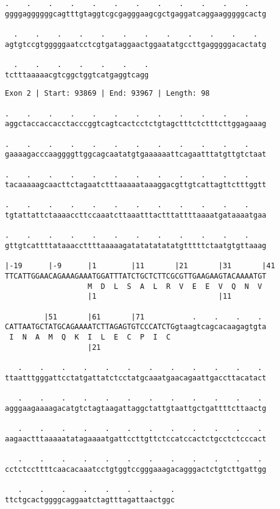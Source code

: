 \documentclass{article}
\begin{document}
\newpage
\begin{Verbatim}[fontfamily=courier]
  .    .    .    .    .    .    .    .    .    .    .    .  
ggggaggggggcagtttgtaggtcgcgagggaagcgctgaggatcaggaagggggcactg

  .    .    .    .    .    .    .    .    .    .    .    .  
agtgtccgtgggggaatcctcgtgataggaactggaatatgccttgagggggacactatg

  .    .    .    .    .    .    .
tctttaaaaacgtcggctggtcatgaggtcagg
\end{Verbatim}
\newpage
\begin{Verbatim}[fontfamily=courier]
Exon 2 | Start: 93869 | End: 93967 | Length: 98

.    .    .    .    .    .    .    .    .    .    .    .    
aggctaccaccacctacccggtcagtcactcctctgtagctttctctttcttggagaaag

.    .    .    .    .    .    .    .    .    .    .    .    
gaaaagacccaaggggttggcagcaatatgtgaaaaaattcagaatttatgttgtctaat

.    .    .    .    .    .    .    .    .    .    .    .    
tacaaaaagcaacttctagaatctttaaaaataaaggacgttgtcattagttctttggtt

.    .    .    .    .    .    .    .    .    .    .    .    
tgtattattctaaaaccttccaaatcttaaatttactttattttaaaatgataaaatgaa

.    .    .    .    .    .    .    .    .    .    .    .    
gttgtcattttataaaccttttaaaaagatatatatatatgtttttctaatgtgttaaag

|-19      |-9      |1        |11       |21       |31       |41
TTCATTGGAACAGAAAGAAATGGATTTATCTGCTCTTCGCGTTGAAGAAGTACAAAATGT
                   M  D  L  S  A  L  R  V  E  E  V  Q  N  V 
                   |1                            |11        

         |51       |61       |71           .    .    .    . 
CATTAATGCTATGCAGAAAATCTTAGAGTGTCCCATCTGgtaagtcagcacaagagtgta
 I  N  A  M  Q  K  I  L  E  C  P  I  C                      
                   |21                                      

   .    .    .    .    .    .    .    .    .    .    .    . 
ttaatttgggattcctatgattatctcctatgcaaatgaacagaattgaccttacatact

   .    .    .    .    .    .    .    .    .    .    .    . 
agggaagaaaagacatgtctagtaagattaggctattgtaattgctgattttcttaactg

   .    .    .    .    .    .    .    .    .    .    .    . 
aagaactttaaaaatatagaaaatgattccttgttctccatccactctgcctctcccact

   .    .    .    .    .    .    .    .    .    .    .    . 
cctctccttttcaacacaaatcctgtggtccgggaaagacagggactctgtcttgattgg

   .    .    .    .    .    .    .    .
ttctgcactggggcaggaatctagtttagattaactggc
\end{Verbatim}
\end{document}
